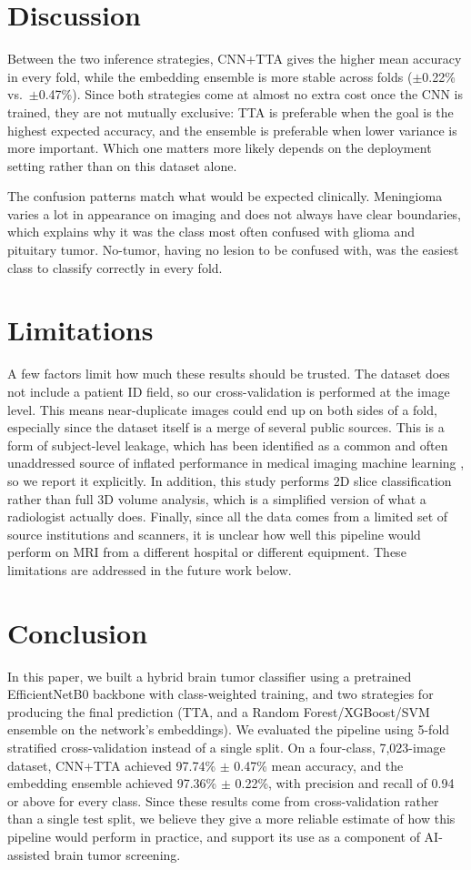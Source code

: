 \documentclass[conference]{IEEEtran}
\begin{document}
\section{Discussion}
Between the two inference strategies, CNN+TTA gives the higher mean accuracy in every fold, while the embedding ensemble is more stable across folds ($\pm$0.22\% vs.\ $\pm$0.47\%). Since both strategies come at almost no extra cost once the CNN is trained, they are not mutually exclusive: TTA is preferable when the goal is the highest expected accuracy, and the ensemble is preferable when lower variance is more important. Which one matters more likely depends on the deployment setting rather than on this dataset alone.

The confusion patterns match what would be expected clinically. Meningioma varies a lot in appearance on imaging and does not always have clear boundaries, which explains why it was the class most often confused with glioma and pituitary tumor. No-tumor, having no lesion to be confused with, was the easiest class to classify correctly in every fold.


\section{Limitations}
A few factors limit how much these results should be trusted. The dataset does not include a patient ID field, so our cross-validation is performed at the image level. This means near-duplicate images could end up on both sides of a fold, especially since the dataset itself is a merge of several public sources. This is a form of subject-level leakage, which has been identified as a common and often unaddressed source of inflated performance in medical imaging machine learning \cite{varoquaux2022leakage}, so we report it explicitly. In addition, this study performs 2D slice classification rather than full 3D volume analysis, which is a simplified version of what a radiologist actually does. Finally, since all the data comes from a limited set of source institutions and scanners, it is unclear how well this pipeline would perform on MRI from a different hospital or different equipment. These limitations are addressed in the future work below.


\section{Conclusion}
In this paper, we built a hybrid brain tumor classifier using a pretrained EfficientNetB0 backbone with class-weighted training, and two strategies for producing the final prediction (TTA, and a Random Forest/XGBoost/SVM ensemble on the network's embeddings). We evaluated the pipeline using 5-fold stratified cross-validation instead of a single split. On a four-class, 7,023-image dataset, CNN+TTA achieved 97.74\% $\pm$ 0.47\% mean accuracy, and the embedding ensemble achieved 97.36\% $\pm$ 0.22\%, with precision and recall of 0.94 or above for every class. Since these results come from cross-validation rather than a single test split, we believe they give a more reliable estimate of how this pipeline would perform in practice, and support its use as a component of AI-assisted brain tumor screening.
\end{document}
